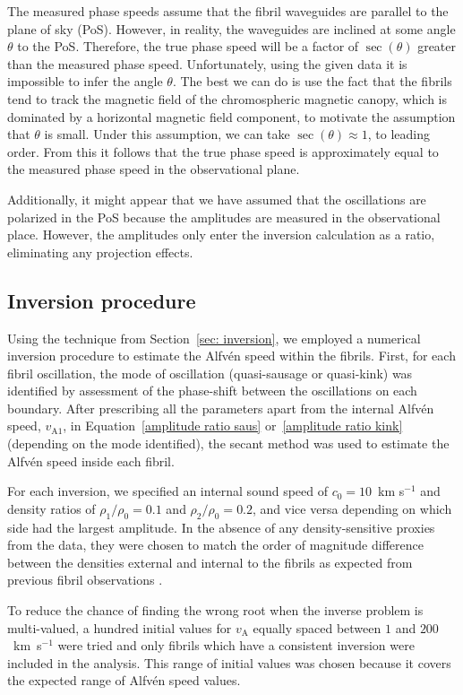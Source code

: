 \documentclass[12pt]{../style-files/ociamthesis}
\begin{document}
The measured phase speeds assume that the fibril waveguides are parallel to the plane of sky (PoS). However, in reality, the waveguides are inclined at some angle $\theta$ to the PoS. Therefore, the true phase speed will be a factor of $\sec(\theta)$ greater than the measured phase speed. Unfortunately, using the given data it is impossible to infer the angle $\theta$. The best we can do is use the fact that the fibrils tend to track the magnetic field of the chromospheric magnetic canopy, which is dominated by a horizontal magnetic field component, to motivate the assumption that $\theta$ is small. Under this assumption, we can take $\sec(\theta) \approx 1$, to leading order. From this it follows that the true phase speed is approximately equal to the measured phase speed in the observational plane.

Additionally, it might appear that we have assumed that the oscillations are polarized in the PoS because the amplitudes are measured in the observational place. However, the amplitudes only enter the inversion calculation as a ratio, eliminating any projection effects.


\subsection{Inversion procedure}\label{sec:inversion}

Using the technique from Section~\ref{sec: inversion}, we employed a numerical inversion procedure to estimate the Alfv\'{e}n speed within the fibrils. First, for each fibril oscillation, the mode of oscillation (quasi-sausage or quasi-kink) was identified by assessment of the phase-shift between the oscillations on each boundary. After prescribing all the parameters apart from the internal Alfv\'{e}n speed, $v_\mathrm{A1}$, in Equation~\eqref{amplitude ratio saus} or~\eqref{amplitude ratio kink} (depending on the mode identified), the secant method was used to estimate the Alfv\'{e}n speed inside each fibril.

For each inversion, we specified an internal sound speed of $c_0 = 10$~km s$^{-1}$ and density ratios of $\rho_1/\rho_0 = 0.1$ and $\rho_2/\rho_0 = 0.2$, and vice versa depending on which side had the largest amplitude. In the absence of any density-sensitive proxies from the data, they were chosen to match the order of magnitude difference between the densities external and internal to the fibrils as expected from previous fibril observations \citep{lee_etal12,mor12}.

To reduce the chance of finding the wrong root when the inverse problem is multi-valued, a hundred initial values for $v_\mathrm{A}$ equally spaced between $1$ and $200$~km~s$^{-1}$ were tried and only fibrils which have a consistent inversion were included in the analysis. This range of initial values was chosen because it covers the expected range of Alfv\'{e}n speed values.
\end{document}
